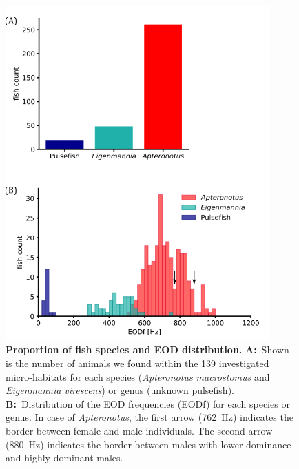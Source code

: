 \begin{figure}[H]
    \centering
    \includegraphics[width=0.9\textwidth]{pictures/Results/fish_count_EOD.png}
    \caption{\textbf{Proportion of fish species and EOD distribution.} \textbf{A:}~Shown is the number of animals we found within the 139 investigated micro-habitats for each species (\textit{Apteronotus macrostomus} and \textit{Eigenmannia virescens}) or genus (unknown pulsefish). \textbf{B:}~Distribution of the EOD frequencies (EODf) for each species or genus. In case of \textit{Apteronotus}, the first arrow (762~Hz) indicates the border between female and male individuals. The second arrow (880~Hz) indicates the border between males with lower dominance and highly dominant males.}
    \label{fig:fish_count_eod}
\end{figure}


